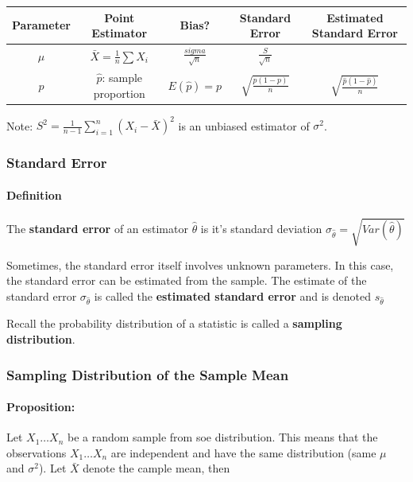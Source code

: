 \begin{table}
    \begin{tabular}{|c|c|c|c|c|}
        \hline
        Parameter & Point Estimator & Bias? & Standard Error & Estimated Standard Error \\
        \hline
        $\mu$ & $\bar{X} = \frac{1}{n} \sum X_i$ & $\frac{sigma}{\sqrt{n}}$ & $\frac{S}{\sqrt{n}}$ \\
        \hline
        $p$ & $\hat{p}$: sample proportion & $E(\hat{p}) = p$ & $\sqrt{\frac{p(1 - p)}{n}}$ & $\sqrt{\frac{\hat{p}(1 - \hat{p})}{n}}$ \\
        \hline
    \end{tabular}
\end{table}

Note: $S^2 = \frac{1}{n - 1} \sum_{i=1}^n (X_i - \bar{X})^2$ is an unbiased estimator of $\sigma^2$.

\subsubsection*{Standard Error}
\paragraph*{Definition}
The \textbf{standard error} of an estimator $\hat{\theta}$ is it's standard deviation $\sigma_{\hat{\theta}} = \sqrt{Var(\hat{\theta})}$

Sometimes, the standard error itself involves unknown parameters. In this case, the standard error can be estimated from the sample. The estimate of the standard error $\sigma_{\hat{\theta}}$ is called the \textbf{estimated standard error} and is denoted $s_{\hat{\theta}}$

Recall the probability distribution of a statistic is called a \textbf{sampling distribution}.

\subsubsection*{Sampling Distribution of the Sample Mean}
\paragraph*{Proposition:}
Let $X_1 \dots X_n$ be a random sample from soe distribution. This means that the observations $X_1 \dots X_n$ are independent and have the same distribution (same $\mu$ and $\sigma^2$). Let $\bar{X}$ denote the cample mean, then


